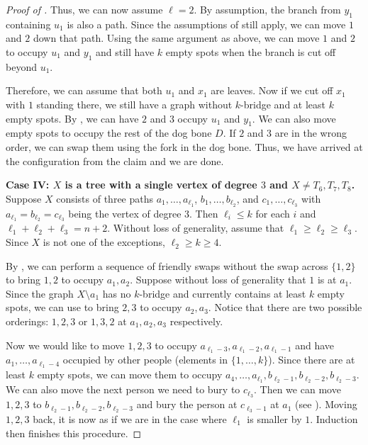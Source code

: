 \documentclass{mystyle}
\begin{document}
\begin{proof}[Proof of ]
    Thus, we can now assume $\ell = 2$. By assumption, the branch from $y_1$ containing $u_1$ is also a path. Since the assumptions of  still apply, we can move $1$ and $2$ down that path. Using the same argument as above, we can move $1$ and $2$ to occupy $u_1$ and $y_1$ and still have $k$ empty spots when the branch is cut off beyond $u_1$. 
    
    Therefore, we can assume that both $u_1$ and $x_1$ are leaves. Now if we cut off $x_1$ with $1$ standing there, we still have a graph without $k$-bridge and at least $k$ empty spots. By , we can have $2$ and $3$ occupy $u_1$ and $y_1$. We can also move empty spots to occupy the rest of the dog bone $D$. If $2$ and $3$ are in the wrong order, we can swap them using the fork in the dog bone. Thus, we have arrived at the configuration from the claim and we are done. 

    \textbf{Case IV: $X$ is a tree with a single vertex of degree $3$ and $X \neq T_6, T_7, T_8$.} Suppose $X$ consists of three paths $a_1, \ldots, a_{\ell_1}$, $b_1, \ldots, b_{\ell_2}$, and $c_1, \ldots, c_{\ell_3}$ with $a_{\ell_1} = b_{\ell_2} = c_{\ell_3}$ being the vertex of degree $3$. Then $\ell_i \leq k$ for each $i$ and $\ell_1 + \ell_2 + \ell_3 = n + 2$. Without loss of generality, assume that $\ell_1 \geq \ell_2 \geq \ell_3$. Since $X$ is not one of the exceptions, $\ell_2 \geq k \geq 4$. 
    
    By , we can perform a sequence of friendly swaps without the swap across $\{1, 2\}$ to bring $1, 2$ to occupy $a_1, a_2$. Suppose without loss of generality that $1$ is at $a_1$. Since the graph $X \setminus a_1$ has no $k$-bridge and currently contains at least $k$ empty spots, we can use  to bring $2, 3$ to occupy $a_2, a_3$. Notice that there are two possible orderings: $1, 2, 3$ or $1, 3, 2$ at $a_1, a_2, a_3$ respectively. 

    Now we would like to move $1, 2, 3$ to occupy $a_{\ell_1 - 3}, a_{\ell_1 - 2}, a_{\ell_1 - 1}$ and have $a_1, \ldots, a_{\ell_1 - 4}$ occupied by other people (elements in $\{1, \ldots, k\}$). Since there are at least $k$ empty spots, we can move them to occupy $a_4, \ldots, a_{\ell_1}, b_{\ell_2 - 1}, b_{\ell_2 - 2}, b_{\ell_2 - 3}$. We can also move the next person we need to bury to $c_{\ell_3}$. Then we can move $1, 2, 3$ to $b_{\ell_2 - 1}, b_{\ell_2 - 2}, b_{\ell_2 - 3}$ and bury the person at $c_{\ell_3 - 1}$ at $a_1$ (see ). Moving $1, 2, 3$ back, it is now as if we are in the case where $\ell_1$ is smaller by $1$. Induction then finishes this procedure. 


\end{proof}
\end{document}
